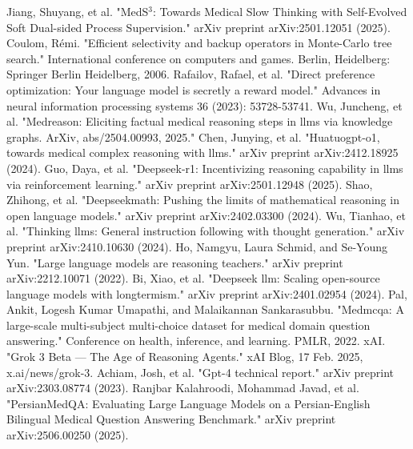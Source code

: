 \documentclass[conference]{IEEEtran}
\begin{document}
\begin{thebibliography}{00}
             Jiang, Shuyang, et al. "MedS$^ 3$: Towards Medical Slow Thinking with Self-Evolved Soft Dual-sided Process Supervision." arXiv preprint arXiv:2501.12051 (2025).
             Coulom, Rémi. "Efficient selectivity and backup operators in Monte-Carlo tree search." International conference on computers and games. Berlin, Heidelberg: Springer Berlin Heidelberg, 2006.
             Rafailov, Rafael, et al. "Direct preference optimization: Your language model is secretly a reward model." Advances in neural information processing systems 36 (2023): 53728-53741.
             Wu, Juncheng, et al. "Medreason: Eliciting factual medical reasoning steps in llms via knowledge graphs. ArXiv, abs/2504.00993, 2025."
             Chen, Junying, et al. "Huatuogpt-o1, towards medical complex reasoning with llms." arXiv preprint arXiv:2412.18925 (2024).
             Guo, Daya, et al. "Deepseek-r1: Incentivizing reasoning capability in llms via reinforcement learning." arXiv preprint arXiv:2501.12948 (2025).
             Shao, Zhihong, et al. "Deepseekmath: Pushing the limits of mathematical reasoning in open language models." arXiv preprint arXiv:2402.03300 (2024).
             Wu, Tianhao, et al. "Thinking llms: General instruction following with thought generation." arXiv preprint arXiv:2410.10630 (2024).
             Ho, Namgyu, Laura Schmid, and Se-Young Yun. "Large language models are reasoning teachers." arXiv preprint arXiv:2212.10071 (2022).
             Bi, Xiao, et al. "Deepseek llm: Scaling open-source language models with longtermism." arXiv preprint arXiv:2401.02954 (2024).
             Pal, Ankit, Logesh Kumar Umapathi, and Malaikannan Sankarasubbu. "Medmcqa: A large-scale multi-subject multi-choice dataset for medical domain question answering." Conference on health, inference, and learning. PMLR, 2022.
             xAI. "Grok 3 Beta — The Age of Reasoning Agents." xAI Blog, 17 Feb. 2025, x.ai/news/grok-3.
             Achiam, Josh, et al. "Gpt-4 technical report." arXiv preprint arXiv:2303.08774 (2023).
             Ranjbar Kalahroodi, Mohammad Javad, et al. "PersianMedQA: Evaluating Large Language Models on a Persian-English Bilingual Medical Question Answering Benchmark." arXiv preprint arXiv:2506.00250 (2025).

\end{thebibliography}
\end{document}
